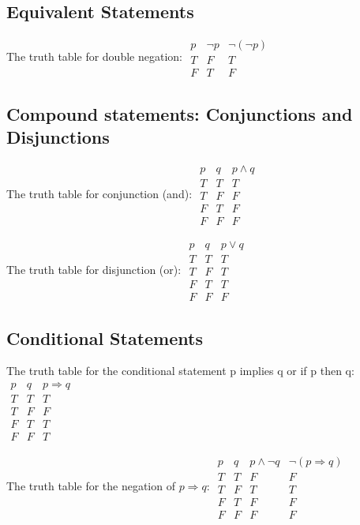 \documentclass{report}
\begin{document}
\subsection*{Equivalent Statements}
\par\noindent The truth table for double negation: $\begin{array}{c||c|c}p & \neg{}p & \neg{}(\neg{}p) \\ \hline T & F & T \\ F & T & F\end{array}$
\subsection*{Compound statements: Conjunctions and Disjunctions}
\par\noindent The truth table for conjunction (and): $\begin{array}{c|c||c} p & q & p\land{}q \\ \hline T & T & T \\ T & F & F \\ F & T & F \\ F & F& F\end{array}$
\par\noindent The truth table for disjunction (or): $\begin{array}{c|c||c}p & q & p\lor{}q \\ \hline T & T & T \\ T & F & T \\ F & T & T \\ F & F & F\end{array}$
\subsection*{Conditional Statements}
\par\noindent The truth table for the conditional statement p implies q or if p then q: $\begin{array}{c|c||c}p & q & p\Rightarrow{}q \\ \hline T & T & T \\ T & F & F \\ F & T & T \\ F & F & T\end{array}$
\par\noindent The truth table for the negation of $p\Rightarrow{}q$: $\begin{array}{c|c||c|c}p & q & p\land\neg{}q & \neg{}(p\Rightarrow{}q) \\ \hline T & T & F & F \\ T & F & T & T \\ F & T & F & F \\ F & F & F & F\end{array}$
\end{document}

